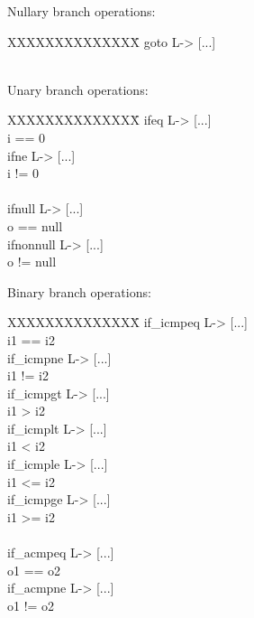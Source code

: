 \begin{slide*}
Nullary branch operations:\\

\begin{tt}
\begin{tabbing}
XXXXXXXXXXXXXX\=\kill
goto L\>[...] -> [...]\\\\
\end{tabbing}
\end{tt}

Unary branch operations:\\
 
\begin{tt}
\begin{tabbing}
XXXXXXXXXXXXXX\=\kill
ifeq L\>[...:i] -> [...]\\ i == 0\\
ifne L\>[...:i] -> [...]\\ i != 0\\
\\
ifnull L\>[...:o] -> [...]\\ o == null\\
ifnonnull L\>[...:o] -> [...]\\ o != null\\
\end{tabbing}
\end{tt}

\vfil
\end{slide*}

\begin{slide*}
Binary branch operations:\\
 
\begin{tt}
\begin{tabbing}
XXXXXXXXXXXXXX\=\kill
if\_icmpeq L\>[...:i1:i2] -> [...]\\ i1 == i2\\
if\_icmpne L\>[...:i1:i2] -> [...]\\ i1 != i2\\
if\_icmpgt L\>[...:i1:i2] -> [...]\\ i1 > i2\\
if\_icmplt L\>[...:i1:i2] -> [...]\\ i1 < i2\\
if\_icmple L\>[...:i1:i2] -> [...]\\ i1 <= i2\\
if\_icmpge L\>[...:i1:i2] -> [...]\\ i1 >= i2\\
\\
if\_acmpeq L\>[...:o1:o2] -> [...]\\ o1 == o2\\
if\_acmpne L\>[...:o1:o2] -> [...]\\ o1 != o2\\
\end{tabbing}
\end{tt}
 
\vfil
\end{slide*}

